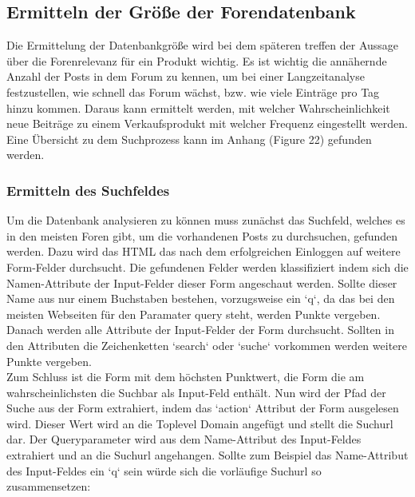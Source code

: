 
\subsection{Ermitteln der Größe der Forendatenbank}
Die Ermittelung der Datenbankgröße wird bei dem späteren treffen der Aussage über die Forenrelevanz für ein Produkt wichtig.
Es ist wichtig die annähernde Anzahl der Posts in dem Forum zu kennen, um bei einer Langzeitanalyse festzustellen, wie schnell das Forum wächst, bzw. wie viele Einträge pro Tag hinzu kommen. Daraus kann ermittelt werden, mit welcher Wahrscheinlichkeit neue Beiträge zu einem Verkaufsprodukt mit welcher Frequenz eingestellt werden.
Eine Übersicht zu dem Suchprozess kann im Anhang (Figure 22) gefunden werden.\\
\subsubsection{Ermitteln des Suchfeldes}
Um die Datenbank analysieren zu können muss zunächst das Suchfeld, welches es in den meisten Foren gibt, um die vorhandenen Posts zu durchsuchen, gefunden werden.
Dazu wird das HTML das nach dem erfolgreichen Einloggen auf weitere Form-Felder durchsucht. Die gefundenen Felder werden klassifiziert indem sich die Namen-Attribute der Input-Felder dieser Form angeschaut werden. Sollte dieser Name aus nur einem Buchstaben bestehen, vorzugsweise ein `q`, da das bei den meisten Webseiten für den Paramater query steht, werden Punkte vergeben.
Danach werden alle Attribute der Input-Felder der Form durchsucht. Sollten in den Attributen die Zeichenketten `search` oder `suche` vorkommen werden weitere Punkte vergeben.\\
Zum Schluss ist die Form mit dem höchsten Punktwert, die Form die am wahrscheinlichsten die Suchbar als Input-Feld enthält.
Nun wird der Pfad der Suche aus der Form extrahiert, indem das `action` Attribut der Form ausgelesen wird. Dieser Wert wird an die Toplevel Domain angefügt und stellt die Suchurl dar. Der Queryparameter wird aus dem Name-Attribut des Input-Feldes extrahiert und an die Suchurl angehangen. Sollte zum Beispiel das Name-Attribut des Input-Feldes ein `q` sein würde sich die vorläufige Suchurl so zusammensetzen:

